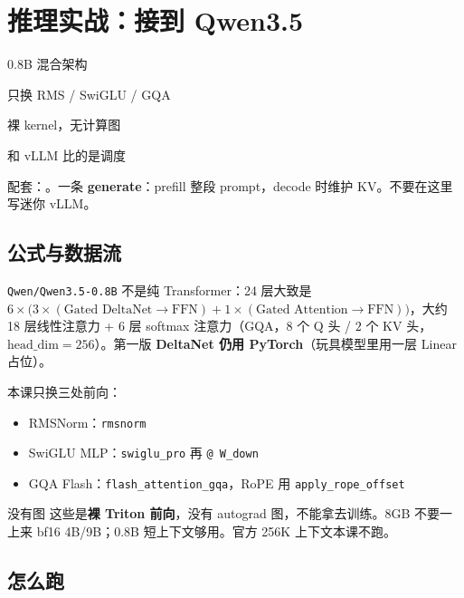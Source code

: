 \chapter{推理实战：接到 Qwen3.5}

\begin{introduction}
  \item 0.8B 混合架构
  \item 只换 RMS / SwiGLU / GQA
  \item 裸 kernel，无计算图
  \item 和 vLLM 比的是调度
\end{introduction}

配套：。一条 \textbf{generate}：prefill 整段 prompt，decode 时维护 KV。不要在这里写迷你 vLLM。

\section{公式与数据流}

\texttt{Qwen/Qwen3.5-0.8B} 不是纯 Transformer：24 层大致是 $6\times\bigl(3\times(\text{Gated DeltaNet}\to\mathrm{FFN}) + 1\times(\text{Gated Attention}\to\mathrm{FFN})\bigr)$，大约 18 层线性注意力 + 6 层 softmax 注意力（GQA，$8$ 个 Q 头 / $2$ 个 KV 头，$\mathrm{head\_dim}=256$）。第一版 \textbf{DeltaNet 仍用 PyTorch}（玩具模型里用一层 Linear 占位）。

本课只换三处前向：

\begin{itemize}
  \item RMSNorm：\texttt{rmsnorm}
  \item SwiGLU MLP：\texttt{swiglu\_pro} 再 \texttt{@ W\_down}
  \item GQA Flash：\texttt{flash\_attention\_gqa}，RoPE 用 \texttt{apply\_rope\_offset}
\end{itemize}


\begin{proposition}{没有图}
这些是\textbf{裸 Triton 前向}，没有 autograd 图，不能拿去训练。8GB 不要一上来 bf16 4B/9B；0.8B 短上下文够用。官方 256K 上下文本课不跑。
\end{proposition}

\section{怎么跑}

